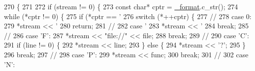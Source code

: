 \begin{DoxyCode}
270                                                                                                    \{
271             
272             \textcolor{keywordflow}{if} (stream != 0) \{
273                 \textcolor{keyword}{const} \textcolor{keywordtype}{char}* cptr = \mbox{\hyperlink{classeasylogger_1_1_logger_ab45891277952285a459ec39a03a91226}{\_format}}.c\_str();
274                 \textcolor{keywordflow}{while} (*cptr != 0) \{
275                     \textcolor{keywordflow}{if} (*cptr == \textcolor{charliteral}{'%
276                         \textcolor{keywordflow}{switch} (*++cptr) \{
277                                 \textcolor{comment}{// %
278                             \textcolor{keywordflow}{case} 0:
279                                 *stream << \textcolor{charliteral}{'%
280                                 \textcolor{keywordflow}{return};
281                                 \textcolor{comment}{// %
282                             \textcolor{keywordflow}{case} \textcolor{charliteral}{'%
283                                 *stream << \textcolor{charliteral}{'%
284                                 \textcolor{keywordflow}{break};
285                                 \textcolor{comment}{// %
286                             \textcolor{keywordflow}{case} \textcolor{charliteral}{'F'}:
287                                 *stream << \textcolor{stringliteral}{"file://"} << file;
288                                 \textcolor{keywordflow}{break};
289                                 \textcolor{comment}{// %
290                             \textcolor{keywordflow}{case} \textcolor{charliteral}{'C'}:
291                                 \textcolor{keywordflow}{if} (line != 0) \{
292                                     *stream << line;
293                                 \} \textcolor{keywordflow}{else} \{
294                                     *stream << \textcolor{charliteral}{'?'};
295                                 \}
296                                 \textcolor{keywordflow}{break};
297                                 \textcolor{comment}{// %
298                             \textcolor{keywordflow}{case} \textcolor{charliteral}{'P'}:
299                                 *stream << func;
300                                 \textcolor{keywordflow}{break};
301                                 \textcolor{comment}{// %
302                             \textcolor{keywordflow}{case} \textcolor{charliteral}{'N'}:
}}}}}}}}}}
\end{DoxyCode}
